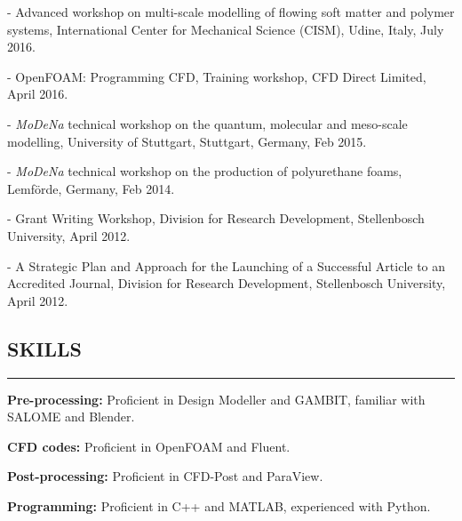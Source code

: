 \documentclass[10pt,a4]{article}
\begin{document}
\begin{small}
\begin{list}{}{}
	\item - Advanced workshop on multi-scale modelling of flowing soft matter and polymer systems, International Center for Mechanical Science (CISM), Udine, Italy, July 2016.
	\item - OpenFOAM: Programming CFD, Training workshop, CFD Direct Limited, April 2016.
	\item - \textit{MoDeNa} technical workshop on the quantum, molecular and meso-scale modelling, University of Stuttgart, Stuttgart, Germany, Feb 2015.	

	\item - \textit{MoDeNa} technical workshop on the production of polyurethane foams, Lemf\"{o}rde, Germany, Feb 2014.

	\item - Grant Writing Workshop, Division for Research Development, Stellenbosch University, April 2012.

	\item - A Strategic Plan and Approach for the Launching of a Successful Article to an Accredited Journal, Division for Research Development, Stellenbosch University, April 2012.
\end{list}

\thispagestyle{fancy}
\rfoot{\textcolor{gray}{Page \thepage}}
\fancyfoot[C]{}



\subsection*{SKILLS}
\hrule
\vspace{0.2cm}
\begin{list}{}{}
	\item \textbf{Pre-processing:} Proficient in Design Modeller and GAMBIT, familiar with SALOME and Blender.
	\item \textbf{CFD codes:} Proficient in OpenFOAM and Fluent.
	\item \textbf{Post-processing:} Proficient in CFD-Post and ParaView.	
	\item \textbf{Programming:} Proficient in C++ and MATLAB, experienced with Python.
\end{list}


\end{small}
\end{document}
